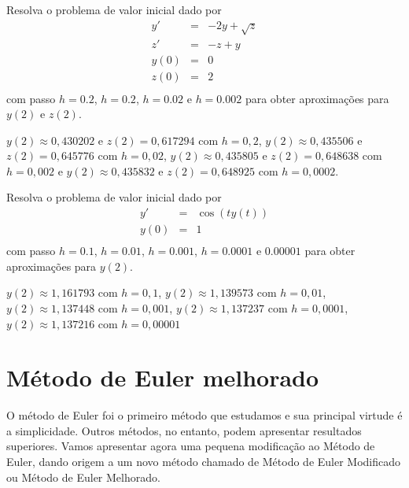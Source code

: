 \begin{Exercise}Resolva o problema de valor inicial dado por
\begin{eqnarray*}
y'&=& -2y + \sqrt{z}\\
z'&=& -z + y\\
y(0)&=&0\\
z(0)&=&2\\
\end{eqnarray*}
com passo $h=0.2$, $h=0.2$, $h=0.02$ e $h=0.002$ para obter aproximações para $y(2)$ e $z(2)$.
\end{Exercise}
\begin{Answer}
  \begin{tiny}
$y(2)\approx 0,430202$ e $z(2)=0,617294$ com $h=0,2$, 
$y(2)\approx 0,435506$ e $z(2)=0,645776$ com $h=0,02$,
$y(2)\approx 0,435805$ e $z(2)=0,648638$ com $h=0,002$ e 
$y(2)\approx 0,435832$ e $z(2)=0,648925$ com $h=0,0002$.     
  \end{tiny}
\end{Answer}

\begin{Exercise}Resolva o problema de valor inicial dado por
\begin{eqnarray*}
y'&=& \cos(ty(t))\\
y(0)&=&1\\
\end{eqnarray*}
com passo $h=0.1$, $h=0.01$, $h=0.001$, $h=0.0001$ e $0.00001$ para obter aproximações para $y(2)$. 
\end{Exercise}
\begin{Answer}
  \begin{tiny}
$y(2)\approx 1,161793$ com $h=0,1$, 
$y(2)\approx 1,139573$ com $h=0,01$,
$y(2)\approx 1,137448$ com $h=0,001$,
$y(2)\approx 1,137237$ com $h=0,0001$,
$y(2)\approx 1,137216$ com $h=0,00001$
  \end{tiny}
\end{Answer}


\section{Método de Euler melhorado}
O método de Euler foi o primeiro método que estudamos e sua principal virtude é a simplicidade. Outros métodos, no entanto, podem apresentar resultados superiores. Vamos apresentar agora uma pequena modificação ao Método de Euler, dando origem a um novo método chamado de Método de Euler Modificado ou Método de Euler Melhorado.

